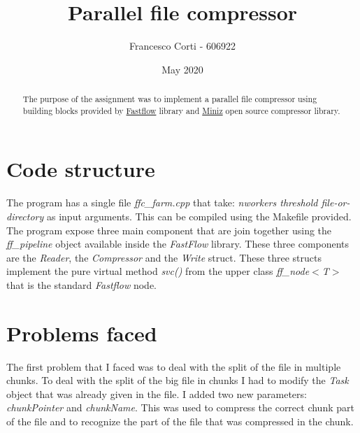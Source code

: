 \documentclass[a4paper,10pt]{article}
\title{Parallel file compressor}
\author{Francesco Corti - 606922}
\date{May 2020}
\begin{document}
		\maketitle
		\begin{abstract}
			The purpose of the assignment was to implement a parallel file compressor using building blocks provided by \href{https://github.com/fastflow/fastflow}{Fastflow} library and \href{https://github.com/richgel999/miniz}{Miniz} open source compressor library. 
		\end{abstract}
\vspace{0.3cm}

\section{Code structure}
The program has a single file \textit{ffc\_farm.cpp} that take: \textit{nworkers threshold file-or-directory} as input arguments. This can be compiled using the Makefile provided. The program expose three main component that are join together using the \textit{ff\_pipeline} object available inside the \textit{FastFlow} library. These three components are the \textit{Reader}, the \textit{Compressor} and the \textit{Write} struct. These three structs implement the pure virtual method \textit{svc()} from the upper class \textit{ff\_node$<$T$>$} that is the standard \textit{Fastflow} node.

\section{Problems faced}
The first problem that I faced was to deal with the split of the file in multiple chunks. To deal with the split of the big file in chunks I had to modify the \textit{Task} object that was already given in the file. I added two new parameters: \textit{chunkPointer} and \textit{chunkName}. This was used to compress the correct chunk part of the file and to recognize the part of the file that was compressed in the chunk. 
\end{document}

